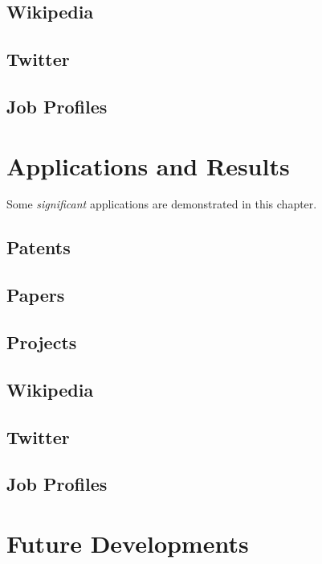 \documentclass[]{book}
\begin{document}
\section{Wikipedia}\label{wikipedia}

\section{Twitter}\label{twitter}

\section{Job Profiles}\label{job-profiles}

\chapter{Applications and Results}\label{applications-and-results}

Some \emph{significant} applications are demonstrated in this chapter.

\section{Patents}\label{patents-1}

\section{Papers}\label{papers-1}

\section{Projects}\label{projects-1}

\section{Wikipedia}\label{wikipedia-1}

\section{Twitter}\label{twitter-1}

\section{Job Profiles}\label{job-profiles-1}

\chapter{Future Developments}\label{future-developments}
\end{document}
